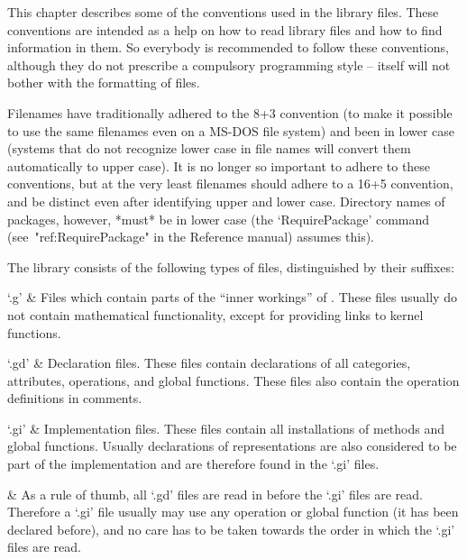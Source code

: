 

This chapter describes some of the conventions used in the {\GAP}
library files.
These conventions are intended as a help on how to read library files and
how to find information in them.
So everybody is recommended to follow these conventions,
although they do not prescribe a compulsory programming style
-- {\GAP} itself will not bother with the formatting of files.

Filenames have traditionally {\GAP} adhered to the 8+3 convention (to make it
possible to use the same filenames even on a MS-DOS file system) and been in
lower case (systems that do not recognize lower case in file names will
convert them automatically to upper case). It is no longer so important to 
adhere to these conventions, but at the very least filenames should adhere
to a 16+5 convention, and be distinct even after identifying upper and lower
case. Directory names of packages, however, *must* be in lower case (the
`RequirePackage' command (see~"ref:RequirePackage" in the Reference manual)
assumes this).


The {\GAP} library consists of the following types of files, distinguished
by their suffixes:

\beginitems
`.g' &
    Files which contain parts of the ``inner workings'' of {\GAP}.
    These files usually do not contain mathematical functionality,
    except for providing links to kernel functions.

`.gd' &
    Declaration files.
    These files contain declarations of all categories, attributes,
    operations, and global functions.
    These files also contain the operation definitions in comments.

`.gi' &
    Implementation files.
    These files contain all installations of methods and global functions.
    Usually declarations of representations are also considered to be
    part of the implementation and are therefore found in the `.gi' files.

    &
    As a rule of thumb, all `.gd' files are read in before the `.gi' files
    are read.
    Therefore a `.gi' file usually may use any operation or global function
    (it has been declared before),
    and no care has to be taken towards the order in which the `.gi' files
    are read.

